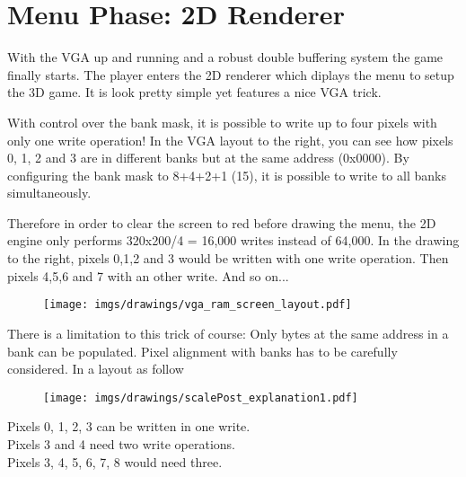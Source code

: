 \section{Menu Phase: 2D Renderer}
With the VGA up and running and a robust double buffering system the game finally starts. The player enters the 2D renderer which diplays the menu to setup the 3D game. It is look pretty simple yet features a nice VGA trick.
\par
\begin{figure}[H]
\centering
{}
\end{figure}
\par


\begin{minipage}{.55\textwidth}
With control over the bank mask, it is possible to write up to four pixels with only one write operation! In the VGA layout to the right, you can see how pixels 0, 1, 2 and 3 are in different banks but at the same address (0x0000). By configuring the bank mask to 8+4+2+1 (15), it is possible to write to all banks simultaneously.\\
\par
Therefore in order to clear the screen to red before drawing the menu, the 2D engine only performs 320x200/4 = 16,000 writes instead of 64,000. In the drawing to the right, pixels 0,1,2 and 3 would be written with one write operation. Then pixels 4,5,6 and 7 with an other write. And so on...\\
\par
\end{minipage}
\begin{minipage}{.4\textwidth}
\begin{figure}[H]
\begin{flushright}
\texttt{[image: imgs/drawings/vga\_ram\_screen\_layout.pdf]}
\end{flushright}
\end{figure}
\end{minipage}

\par



There is a limitation to this trick of course: Only bytes at the same address in a bank can be populated. Pixel alignment with banks has to be carefully considered. In a layout as follow\\
\par
\begin{figure}[H]
\centering
 \texttt{[image: imgs/drawings/scalePost\_explanation1.pdf]}
 \end{figure}
Pixels 0, 1, 2, 3 can be written in one write.\\
Pixels 3 and 4 need two write operations.\\
Pixels 3, 4, 5, 6, 7, 8 would need three.\\


